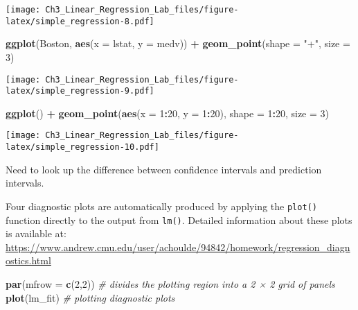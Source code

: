 \documentclass[]{article}
\newenvironment{Shaded}{\begin{snugshade}}{\end{snugshade}}
\newcommand{\CommentTok}[1]{\textcolor[rgb]{0.56,0.35,0.01}{\textit{#1}}}
\newcommand{\DataTypeTok}[1]{\textcolor[rgb]{0.13,0.29,0.53}{#1}}
\newcommand{\DecValTok}[1]{\textcolor[rgb]{0.00,0.00,0.81}{#1}}
\newcommand{\KeywordTok}[1]{\textcolor[rgb]{0.13,0.29,0.53}{\textbf{#1}}}
\newcommand{\NormalTok}[1]{#1}
\newcommand{\OperatorTok}[1]{\textcolor[rgb]{0.81,0.36,0.00}{\textbf{#1}}}
\newcommand{\StringTok}[1]{\textcolor[rgb]{0.31,0.60,0.02}{#1}}
\begin{document}
\texttt{[image: Ch3\_Linear\_Regression\_Lab\_files/figure-latex/simple\_regression-8.pdf]}

\begin{Shaded}
\begin{Highlighting}[]
\KeywordTok{ggplot}\NormalTok{(Boston, }\KeywordTok{aes}\NormalTok{(}\DataTypeTok{x =}\NormalTok{ lstat, }\DataTypeTok{y =}\NormalTok{ medv)) }\OperatorTok{+}
\StringTok{  }\KeywordTok{geom_point}\NormalTok{(}\DataTypeTok{shape =} \StringTok{"+"}\NormalTok{, }\DataTypeTok{size =} \DecValTok{3}\NormalTok{)}
\end{Highlighting}
\end{Shaded}

\texttt{[image: Ch3\_Linear\_Regression\_Lab\_files/figure-latex/simple\_regression-9.pdf]}

\begin{Shaded}
\begin{Highlighting}[]
\KeywordTok{ggplot}\NormalTok{() }\OperatorTok{+}
\StringTok{  }\KeywordTok{geom_point}\NormalTok{(}\KeywordTok{aes}\NormalTok{(}\DataTypeTok{x =} \DecValTok{1}\OperatorTok{:}\DecValTok{20}\NormalTok{, }\DataTypeTok{y =} \DecValTok{1}\OperatorTok{:}\DecValTok{20}\NormalTok{), }\DataTypeTok{shape =} \DecValTok{1}\OperatorTok{:}\DecValTok{20}\NormalTok{, }\DataTypeTok{size =} \DecValTok{3}\NormalTok{)}
\end{Highlighting}
\end{Shaded}

\texttt{[image: Ch3\_Linear\_Regression\_Lab\_files/figure-latex/simple\_regression-10.pdf]}

Need to look up the difference between confidence intervals and
prediction intervals.

Four diagnostic plots are automatically produced by applying the
\texttt{plot()} function directly to the output from \texttt{lm()}.
Detailed information about these plots is available at:
\url{https://www.andrew.cmu.edu/user/achoulde/94842/homework/regression_diagnostics.html}

\begin{Shaded}
\begin{Highlighting}[]
\KeywordTok{par}\NormalTok{(}\DataTypeTok{mfrow =} \KeywordTok{c}\NormalTok{(}\DecValTok{2}\NormalTok{,}\DecValTok{2}\NormalTok{)) }\CommentTok{# divides the plotting region into a 2 × 2 grid of panels}
\KeywordTok{plot}\NormalTok{(lm_fit) }\CommentTok{# plotting diagnostic plots}
\end{Highlighting}
\end{Shaded}
\end{document}
